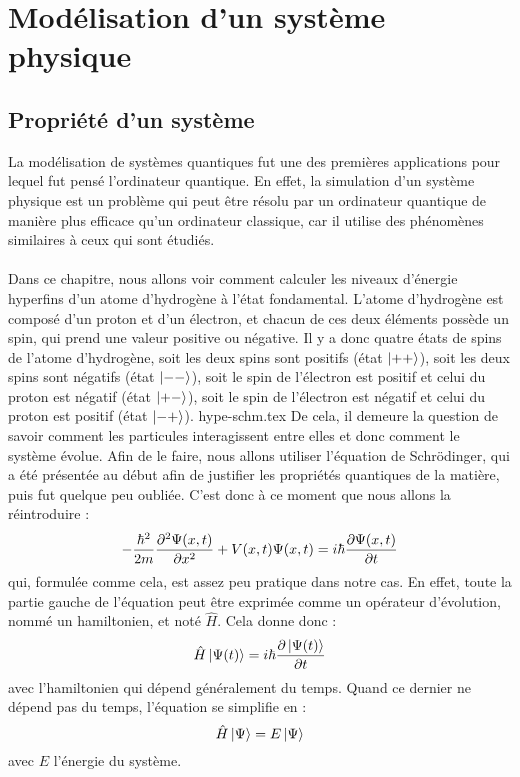 \chapter{Modélisation d'un système physique}\label{ch:modelisation-d'un-systeme-physique}

\section{Propriété d'un système}\label{sec:propriete-d'un-systeme}
La modélisation de systèmes quantiques fut une des premières applications pour lequel
fut pensé l'ordinateur quantique.
En effet, la simulation d'un système physique est un problème qui peut être résolu par
un ordinateur quantique de manière plus efficace qu'un ordinateur classique, car il
utilise des phénomènes similaires à ceux qui sont étudiés.\\ \\
Dans ce chapitre, nous allons voir comment calculer les niveaux d'énergie hyperfins
d'un atome d'hydrogène à l'état fondamental.
L'atome d'hydrogène est composé d'un proton et d'un électron, et chacun de ces deux
éléments possède un spin, qui prend une valeur positive ou négative.
Il y a donc quatre états de spins de l'atome d'hydrogène, soit les deux spins sont
positifs (état $\ket{++}$), soit les deux spins sont négatifs (état $\ket{--}$), soit
le spin de l'électron est positif et celui du proton est négatif (état $\ket{+-}$), soit
le spin de l'électron est négatif et celui du proton est positif (état $\ket{-+}$).
{hype-schm.tex}
De cela, il demeure la question de savoir comment les particules interagissent entre
elles et donc comment le système évolue.
Afin de le faire, nous allons utiliser l'équation de Schrödinger, qui a été présentée
au début afin de justifier les propriétés quantiques de la matière, puis fut quelque
peu oubliée.
C'est donc à ce moment que nous allons la réintroduire :
\[
    - \frac{\hbar^2}{2m} \pdv[2]{\Psi (x,t)}{x} + V(x,t) \Psi (x,t) = i \hbar \pdv{\Psi (x,t)}{t}
\]
qui, formulée comme cela, est assez peu pratique dans notre cas.
En effet, toute la partie gauche de l'équation peut être exprimée comme un opérateur
d'évolution, nommé un hamiltonien, et noté $\hat{H}$.
Cela donne donc :
\[
    \hat{H} \ket{\Psi (t)} = i \hbar \pdv{\ket{\Psi (t)}}{t}
\]
avec l'hamiltonien qui dépend généralement du temps.
Quand ce dernier ne dépend pas du temps, l'équation se simplifie en :
\[
    \hat{H} \ket{\Psi} = E \ket{\Psi}
\]
avec $E$ l'énergie du système.\\ \\
